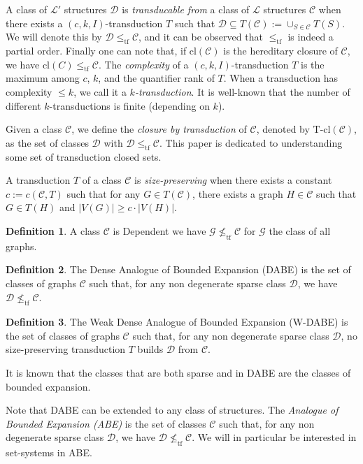 \documentclass[11pt]{article}
\theoremstyle{definition}
\newtheorem{definition}{Definition}
\newcommand{\CC}{{\mathscr C}}
\newcommand{\DD}{{\mathscr D}}
\renewcommand{\le}{\leqslant}
\renewcommand{\ge}{\geqslant}
\newcommand{\Ll}{\mathcal L}
\newcommand{\remph}[1]{{\color{red} \emph{#1}}}
\newcommand{\tf}{\leqslant_{\text{tf}}}
\newcommand{\Tcl}{\text{T-cl}}
\begin{document}
A class of $\Ll'$ structures $\DD$ is \remph{transducable from} a class of $\Ll$ structures $\CC$ when there exists a $(c, k, I)$-transduction $T$ such that $\DD \subseteq  T(\CC) := \cup_{S \in \CC} T(S)$.
We will denote this by $\DD \tf \CC$, and it can be observed that $\tf$ is indeed a partial order. Finally one can note that, if $\text{cl}(\CC)$ is the hereditary closure of $\CC$, we have $\text{cl}(C) \tf \CC$.
The \remph{complexity} of a $(c, k, I)$-transduction $T$ is the maximum among $c$, $k$, and the quantifier rank of $T$.
When a transduction has complexity $\le k$, we call it a \remph{$k$-transduction}.
It is well-known that the number of different $k$-transductions is finite (depending on $k$).

Given a class $\CC$, we define the \remph{closure by transduction} of $\CC$, denoted by $\Tcl(\CC)$, as the set of classes $\DD$ with $\DD \tf \CC$.
This paper is dedicated to understanding some set of transduction closed sets.

A transduction $T$ of a class $\CC$ is \remph{size-preserving} when there exists a constant $c := c(\mathcal \CC, T)$ such that for any $G \in T(\CC)$, there exists a graph $H \in \CC$ such that $G \in T(H)$ and $|V(G)| \ge c \cdot |V(H)|$.
\begin{definition}
A class $\CC$ is Dependent we have $\mathcal G \not \tf \CC$ for $\mathcal G$ the class of all graphs.
\end{definition}

\begin{definition}
The Dense Analogue of Bounded Expansion (DABE) is the set of classes of graphs $\CC$ such that, for any non degenerate sparse class $\DD$, we have $\DD \not \tf \CC$.
\end{definition}

\begin{definition}
The Weak Dense Analogue of Bounded Expansion (W-DABE) is the set of classes of graphs $\CC$ such that, for any non degenerate sparse class $\DD$, no size-preserving transduction $T$ builds $\DD$ from $\CC$.
\end{definition}

It is known that the classes that are both sparse and in DABE are the classes of bounded expansion.
 
Note that DABE can be extended to any class of structures.
The \remph{Analogue of Bounded Expansion (ABE)} is the set of classes $\CC$ such that, for any non degenerate sparse class $\DD$, we have $\DD \not \tf \CC$.
We will in particular be interested in set-systems in ABE.
\end{document}
